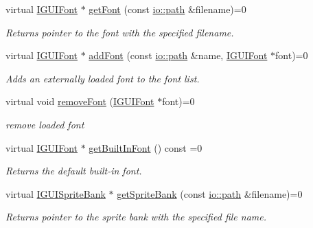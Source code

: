 \begin{DoxyCompactItemize}
virtual \hyperlink{classirr_1_1gui_1_1IGUIFont}{I\+G\+U\+I\+Font} $\ast$ \hyperlink{classirr_1_1gui_1_1IGUIEnvironment_a22074f9a1a5a86d5d216126bbb90b3b1}{get\+Font} (const \hyperlink{namespaceirr_1_1io_ab1bdc45edb3f94d8319c02bc0f840ee1}{io\+::path} \&filename)=0
\begin{DoxyCompactList}\small\item\em Returns pointer to the font with the specified filename. \end{DoxyCompactList}\item 
virtual \hyperlink{classirr_1_1gui_1_1IGUIFont}{I\+G\+U\+I\+Font} $\ast$ \hyperlink{classirr_1_1gui_1_1IGUIEnvironment_a2c4fefb8a67fc92aedbbff6254532c2b}{add\+Font} (const \hyperlink{namespaceirr_1_1io_ab1bdc45edb3f94d8319c02bc0f840ee1}{io\+::path} \&name, \hyperlink{classirr_1_1gui_1_1IGUIFont}{I\+G\+U\+I\+Font} $\ast$font)=0
\begin{DoxyCompactList}\small\item\em Adds an externally loaded font to the font list. \end{DoxyCompactList}\item 
\mbox{\label{classirr_1_1gui_1_1IGUIEnvironment_a414f61b6901e7328448247648fdf9375}} 
virtual void \hyperlink{classirr_1_1gui_1_1IGUIEnvironment_a414f61b6901e7328448247648fdf9375}{remove\+Font} (\hyperlink{classirr_1_1gui_1_1IGUIFont}{I\+G\+U\+I\+Font} $\ast$font)=0
\begin{DoxyCompactList}\small\item\em remove loaded font \end{DoxyCompactList}\item 
virtual \hyperlink{classirr_1_1gui_1_1IGUIFont}{I\+G\+U\+I\+Font} $\ast$ \hyperlink{classirr_1_1gui_1_1IGUIEnvironment_a896fbfcbad5ccf187a835827b439da93}{get\+Built\+In\+Font} () const =0
\begin{DoxyCompactList}\small\item\em Returns the default built-\/in font. \end{DoxyCompactList}\item 
virtual \hyperlink{classirr_1_1gui_1_1IGUISpriteBank}{I\+G\+U\+I\+Sprite\+Bank} $\ast$ \hyperlink{classirr_1_1gui_1_1IGUIEnvironment_a187ebb28837dbdb88810f7e493096c3f}{get\+Sprite\+Bank} (const \hyperlink{namespaceirr_1_1io_ab1bdc45edb3f94d8319c02bc0f840ee1}{io\+::path} \&filename)=0
\begin{DoxyCompactList}\small\item\em Returns pointer to the sprite bank with the specified file name. \end{DoxyCompactList}\item 

\end{DoxyCompactItemize}
